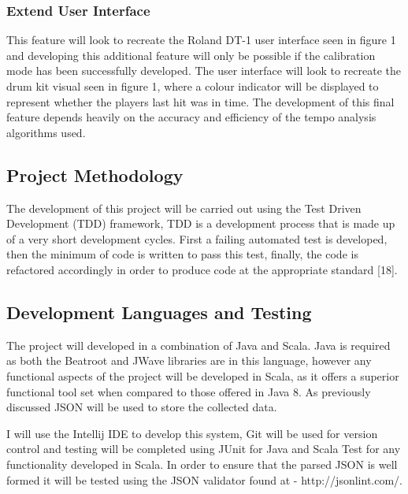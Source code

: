 \documentclass[a4paper, 11pt]{article}
\begin{document}
\subsubsection{Extend User Interface}
This feature will look to recreate the Roland DT-1 user interface seen in figure 1 and developing this additional feature will only be possible if the calibration mode has been successfully developed. The user interface will look to recreate the drum kit visual seen in figure 1, where a colour indicator will be displayed to represent whether the players last hit was in time. The development of this final feature depends heavily on the accuracy and efficiency of the tempo analysis algorithms used.

\subsection{Project Methodology}
The development of this project will be carried out using the Test Driven Development (TDD) framework, TDD is a development process that is made up of a very short development cycles. First a failing automated test is developed, then the minimum of code is written to pass this test, finally, the code is refactored accordingly in order to produce code at the appropriate standard [18].

\subsection{Development Languages and Testing}
The project will developed in a combination of Java and Scala. Java is required as both the Beatroot and JWave libraries are in this language, however any functional aspects of the project will be developed in Scala, as it offers a superior functional tool set when compared to those offered in Java 8. As previously discussed JSON will be used to store the collected data.

I will use the Intellij IDE to develop this system, Git will be used for version control and testing will be completed using JUnit for Java and Scala Test for any functionality developed in Scala. In order to ensure that the parsed JSON is well formed it will be tested using the JSON validator found at - http://jsonlint.com/.

\clearpage
\maketitle{} 
\end{document}

